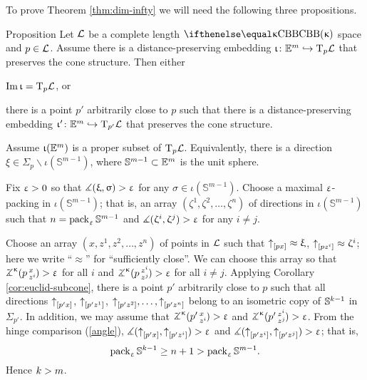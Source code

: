 To prove Theorem \ref{thm:dim-infty} we will need the following three propositions.

\begin{thm}{Proposition}\label{E=T}
Let $\mathcal{L}$ be a complete length $\Alex{\kappa}$ space and $p\in \spc{L}$.
Assume there is a distance-preserving embedding $\iota\:\EE^{m}\hookrightarrow \T_p\spc{L}$ 
that preserves the cone structure.
Then either
\begin{subthm}{}
 $\mathop{\rm Im}\nolimits\upiota=\text{\rm T}_p\mathcal{L}$, or
\end{subthm}

\begin{subthm}{} there is a point $p'$ arbitrarily close to $p$ such that there is a distance-preserving embedding $\iota'\:\EE^{m}\hookrightarrow \T_{p'}\spc{L}$ 
that preserves the cone structure.
\end{subthm}
\end{thm}

Assume $\upiota(\mathbb{E}^{m})$ is a proper subset of $\text{\rm T}_p\mathcal{L}$.
Equivalently, there is a direction $\xi \in \Sigma_p\backslash\iota(\mathbb{S}^{m-1})$,
where $\mathbb{S}^{m-1}\subset \EE^m$ is the unit sphere. 

Fix $\upvarepsilon>0$ so that $\measuredangle(\upxi,\upsigma)>\upvarepsilon$ for any $\sigma\in \iota(\mathbb{S}^{m-1})$. 
Choose a maximal $\upvarepsilon$-packing in $\iota(\mathbb{S}^{m-1})$;
that is, an array $(\zeta^1,\zeta^2,\dots,\zeta^n)$ of directions in $\iota(\mathbb{S}^{m-1})$ such that $n=\mathop{\rm pack}\nolimits_\upvarepsilon \mathbb{S}^{m-1}$ and $\measuredangle(\upzeta^i,\upzeta^j)>\upvarepsilon$ for any $i\ne j$.

Choose an array $(x,z^1,z^2,\dots,z^n)$ of points in $\mathcal{L}$ such that
$\dir p x\approx\xi$, $\dir p{z^i}\approx\zeta^i$; 
here we write ``$\approx$'' for ``sufficiently close''.
We can choose this array so that
$\angk{\kappa}p x{z^i}>\eps$ for all $i$ 
and $\angk{\kappa}p{z^i}{z^j}>\eps$ for all $i\ne j$.
Applying Corollary \ref{cor:euclid-subcone}, there is a point $p'$ arbitrarily close to $p$ 
such that all directions ${\uparrow}_{[{p'}{x}]}$, ${\uparrow}_{[{p'}{z^1}]}$, $\dir{p'}{z^2},\dots,\dir{p'}{z^n}$
belong to an isometric copy of $\mathbb{S}^{k-1}$ in $\Sigma_{p'}$.
In addition, we may assume that $\angk{\kappa}{p'}x{z^i}>\eps$ and $\angk{\kappa}{p'}{z^i}{z^j}>\eps$.
From the hinge comparison (\ref{angle}),
$\measuredangle({\uparrow}_{[{p'}{x}]},{\uparrow}_{[{p'}{z^i}]})>\upvarepsilon$ 
and $\measuredangle({\uparrow}_{[{p'}{z^i}]},{\uparrow}_{[{p'}{z^j}]})>\upvarepsilon$;
that is, 
\[\pack_\eps \mathbb{S}^{\kay-1}\ge n+1>\pack_\eps \mathbb{S}^{m-1}.\] 
Hence $k>m$.
\qeds

